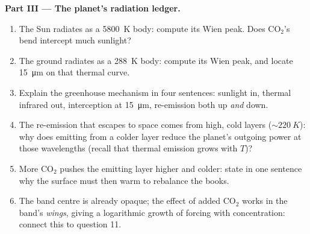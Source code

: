 \begin{problem}
\medskip\noindent\textbf{Part III --- The planet's radiation ledger.}
\begin{enumerate}[resume]
  \item The Sun radiates as a \qty{5800}{K} body: compute its Wien
        peak. Does CO$_2$'s bend intercept much sunlight?
  \item The ground radiates as a \qty{288}{K} body: compute its
        Wien peak, and locate \qty{15}{\micro m} on that thermal
        curve.
  \item Explain the greenhouse mechanism in four sentences:
        sunlight in, thermal infrared out, interception at
        \qty{15}{\micro m}, re-emission both up \emph{and} down.
  \item The re-emission that escapes to space comes from high, cold
        layers ($\sim\qty{220}{K}$): why does emitting from a colder
        layer reduce the planet's outgoing power at those
        wavelengths (recall that thermal emission grows with $T$)?
  \item More CO$_2$ pushes the emitting layer higher and colder:
        state in one sentence why the surface must then warm to
        rebalance the books.
  \item The band centre is already opaque; the effect of added
        CO$_2$ works in the band's \emph{wings}, giving a
        logarithmic growth of forcing with concentration: connect
        this to question 11.
\end{enumerate}


\end{problem}
